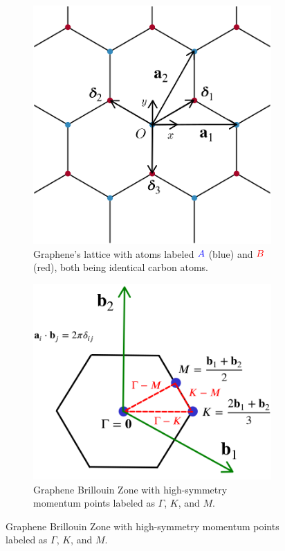 \begin{figure}[H]
\centering
\begin{subfigure}{.48\textwidth}
  \centering
  \includegraphics[height=.78\linewidth]{fig/honeycomb_coordinates_deltas.png}
  \caption{Graphene's lattice with atoms labeled $\textcolor{blue}{A}$ (blue) and $\textcolor{red}{B}$ (red), both being identical carbon atoms.}
  \label{fig:graphene-lattice_a}
\end{subfigure} \hfill
\begin{subfigure}{.48\textwidth}
  \centering
  \includegraphics[height=.78\linewidth]{fig/honeycomb_tqc_BZ.png}
  \caption{Graphene Brillouin Zone with high-symmetry momentum points labeled as $\Gamma$, $K$, and $M$.}
  \label{fig:graphene-lattice_b}
\end{subfigure}
\label{fig:graphene-lattice}
\end{figure}

